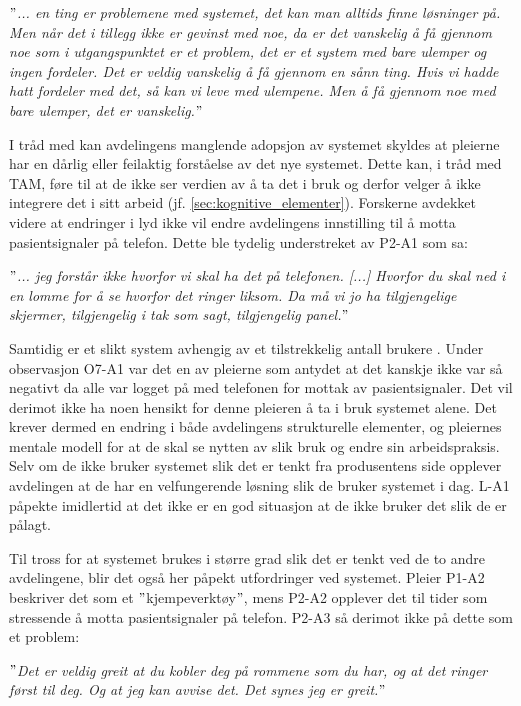 \noindent
\textit{$"$... en ting er problemene med systemet, det kan man alltids finne løsninger på. Men når det i tillegg ikke er gevinst med noe, da er det vanskelig å få gjennom noe som i utgangspunktet er et problem, det er et system med bare ulemper og ingen fordeler. Det er veldig vanskelig å få gjennom en sånn ting. Hvis vi hadde hatt fordeler med det, så kan vi leve med ulempene. Men å få gjennom noe med bare ulemper, det er vanskelig.$"$}

\noindent
I tråd med \citet{Orlikowski92} kan avdelingens manglende adopsjon av systemet skyldes at pleierne har en dårlig eller feilaktig forståelse av det nye systemet. Dette kan, i tråd med TAM, føre til at de ikke ser verdien av å ta det i bruk og derfor velger å ikke integrere det i sitt arbeid (jf. \ref{sec:kognitive_elementer}). Forskerne avdekket videre at endringer i lyd ikke vil endre avdelingens innstilling til å motta pasientsignaler på telefon. Dette ble tydelig understreket av P2-A1 som sa:

\noindent
\textit{$"$... jeg forstår ikke hvorfor vi skal ha det på telefonen. [...] Hvorfor du skal ned i en lomme for å se hvorfor det ringer liksom. Da må vi jo ha tilgjengelige skjermer, tilgjengelig i tak som sagt, tilgjengelig panel.$"$}

\noindent
Samtidig er et slikt system avhengig av et tilstrekkelig antall brukere \citep{Ackermann00}. Under observasjon O7-A1 var det en av pleierne som antydet at det kanskje ikke var så negativt da alle var logget på med telefonen for mottak av pasientsignaler. Det vil derimot ikke ha noen hensikt for denne pleieren å ta i bruk systemet alene. Det krever dermed en endring i både avdelingens strukturelle elementer, og pleiernes mentale modell for at de skal se nytten av slik bruk og endre sin arbeidspraksis.
Selv om de ikke bruker systemet slik det er tenkt fra produsentens side opplever avdelingen at de har en velfungerende løsning slik de bruker systemet i dag. L-A1 påpekte imidlertid at det ikke er en god situasjon at de ikke bruker det slik de er pålagt. 

\noindent
Til tross for at systemet brukes i større grad slik det er tenkt ved de to andre avdelingene, blir det også her påpekt utfordringer ved systemet. Pleier P1-A2 beskriver det som et $"$kjempeverktøy$"$, mens P2-A2 opplever det til tider som stressende å motta pasientsignaler på telefon. P2-A3 så derimot ikke på dette som et problem: 

\noindent
\textit{$"$Det er veldig greit at du kobler deg på rommene som du har, og at det ringer først til deg. Og at jeg kan avvise det. Det synes jeg er greit.$"$}

